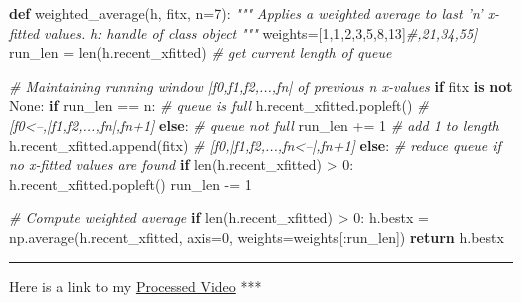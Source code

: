 \documentclass[11pt]{article}
\newenvironment{Shaded}{}{}
\newcommand{\KeywordTok}[1]{\textcolor[rgb]{0.00,0.44,0.13}{\textbf{{#1}}}}
\newcommand{\DecValTok}[1]{\textcolor[rgb]{0.25,0.63,0.44}{{#1}}}
\newcommand{\CommentTok}[1]{\textcolor[rgb]{0.38,0.63,0.69}{\textit{{#1}}}}
\newcommand{\NormalTok}[1]{{#1}}
\newcommand{\VariableTok}[1]{\textcolor[rgb]{0.10,0.09,0.49}{{#1}}}
\newcommand{\ControlFlowTok}[1]{\textcolor[rgb]{0.00,0.44,0.13}{\textbf{{#1}}}}
\newcommand{\OperatorTok}[1]{\textcolor[rgb]{0.40,0.40,0.40}{{#1}}}
\newcommand{\BuiltInTok}[1]{{#1}}
\begin{document}
\begin{Shaded}
\begin{Highlighting}[]
\KeywordTok{def}\NormalTok{ weighted_average(h, fitx, n}\OperatorTok{=}\DecValTok{7}\NormalTok{):}
    \CommentTok{""" }
\CommentTok{    Applies a weighted average to last 'n' x-fitted values.}
\CommentTok{    }
\CommentTok{    h: handle of class object}
\CommentTok{    """}
\NormalTok{    weights}\OperatorTok{=}\NormalTok{[}\DecValTok{1}\NormalTok{,}\DecValTok{1}\NormalTok{,}\DecValTok{2}\NormalTok{,}\DecValTok{3}\NormalTok{,}\DecValTok{5}\NormalTok{,}\DecValTok{8}\NormalTok{,}\DecValTok{13}\NormalTok{]}\CommentTok{#,21,34,55]}
\NormalTok{    run_len }\OperatorTok{=} \BuiltInTok{len}\NormalTok{(h.recent_xfitted)  }\CommentTok{# get current length of queue}

    \CommentTok{# Maintaining running window |f0,f1,f2,...,fn| of previous n x-values}
    \ControlFlowTok{if}\NormalTok{ fitx }\KeywordTok{is} \KeywordTok{not} \VariableTok{None}\NormalTok{:}
        \ControlFlowTok{if}\NormalTok{ run_len }\OperatorTok{==}\NormalTok{ n:  }\CommentTok{# queue is full}
\NormalTok{            h.recent_xfitted.popleft()  }\CommentTok{# [f0<--,|f1,f2,...,fn|,fn+1]}
        \ControlFlowTok{else}\NormalTok{:             }\CommentTok{# queue not full}
\NormalTok{            run_len }\OperatorTok{+=} \DecValTok{1}  \CommentTok{# add 1 to length}
\NormalTok{        h.recent_xfitted.append(fitx)  }\CommentTok{# [f0,|f1,f2,...,fn<--|,fn+1]}
    \ControlFlowTok{else}\NormalTok{:  }\CommentTok{# reduce queue if no x-fitted values are found}
        \ControlFlowTok{if} \BuiltInTok{len}\NormalTok{(h.recent_xfitted) }\OperatorTok{>} \DecValTok{0}\NormalTok{:}
\NormalTok{            h.recent_xfitted.popleft()}
\NormalTok{            run_len }\OperatorTok{-=} \DecValTok{1}

    \CommentTok{# Compute weighted average}
    \ControlFlowTok{if} \BuiltInTok{len}\NormalTok{(h.recent_xfitted) }\OperatorTok{>} \DecValTok{0}\NormalTok{:}
\NormalTok{        h.bestx }\OperatorTok{=}\NormalTok{ np.average(h.recent_xfitted, axis}\OperatorTok{=}\DecValTok{0}\NormalTok{, weights}\OperatorTok{=}\NormalTok{weights[:run_len])}
    \ControlFlowTok{return}\NormalTok{ h.bestx}
\end{Highlighting}
\end{Shaded}

\begin{center}\rule{0.5\linewidth}{\linethickness}\end{center}

Here is a link to my \href{./project_video_output.mp4}{Processed Video}
***
\end{document}

